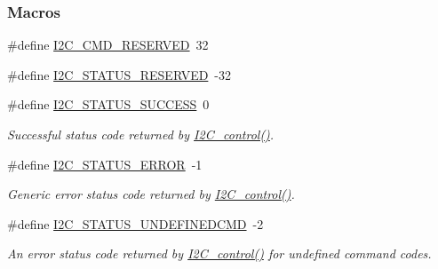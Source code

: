 \subsubsection*{Macros}
\begin{DoxyCompactItemize}
\item 
\#define \hyperlink{group___i2_c___c_o_n_t_r_o_l_ga760ec0a6fdb876ccc67b6f06301d53ec}{I2\+C\+\_\+\+C\+M\+D\+\_\+\+R\+E\+S\+E\+R\+V\+E\+D}~32
\item 
\#define \hyperlink{group___i2_c___c_o_n_t_r_o_l_gacfd04572fe349d087c2547501cbc7e0a}{I2\+C\+\_\+\+S\+T\+A\+T\+U\+S\+\_\+\+R\+E\+S\+E\+R\+V\+E\+D}~-\/32
\item 
\#define \hyperlink{group___i2_c___s_t_a_t_u_s_gaa0bcf3acd26ac82bd8ff91daba2c78c4}{I2\+C\+\_\+\+S\+T\+A\+T\+U\+S\+\_\+\+S\+U\+C\+C\+E\+S\+S}~0
\begin{DoxyCompactList}\small\item\em Successful status code returned by \hyperlink{_i2_c_8h_a633003582213a5098467a4e647cc52f9}{I2\+C\+\_\+control()}. \end{DoxyCompactList}\item 
\#define \hyperlink{group___i2_c___s_t_a_t_u_s_ga7323fe57c39c46d0da9910e17f5f0b06}{I2\+C\+\_\+\+S\+T\+A\+T\+U\+S\+\_\+\+E\+R\+R\+O\+R}~-\/1
\begin{DoxyCompactList}\small\item\em Generic error status code returned by \hyperlink{_i2_c_8h_a633003582213a5098467a4e647cc52f9}{I2\+C\+\_\+control()}. \end{DoxyCompactList}\item 
\#define \hyperlink{group___i2_c___s_t_a_t_u_s_ga11c31c9869ed2441789205d9e5967d66}{I2\+C\+\_\+\+S\+T\+A\+T\+U\+S\+\_\+\+U\+N\+D\+E\+F\+I\+N\+E\+D\+C\+M\+D}~-\/2
\begin{DoxyCompactList}\small\item\em An error status code returned by \hyperlink{_i2_c_8h_a633003582213a5098467a4e647cc52f9}{I2\+C\+\_\+control()} for undefined command codes. \end{DoxyCompactList}\end{DoxyCompactItemize}
